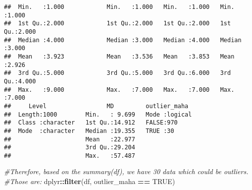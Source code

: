 \documentclass[]{article}
\newenvironment{Shaded}{\begin{snugshade}}{\end{snugshade}}
\newcommand{\KeywordTok}[1]{\textcolor[rgb]{0.13,0.29,0.53}{\textbf{#1}}}
\newcommand{\StringTok}[1]{\textcolor[rgb]{0.31,0.60,0.02}{#1}}
\newcommand{\CommentTok}[1]{\textcolor[rgb]{0.56,0.35,0.01}{\textit{#1}}}
\newcommand{\OtherTok}[1]{\textcolor[rgb]{0.56,0.35,0.01}{#1}}
\newcommand{\OperatorTok}[1]{\textcolor[rgb]{0.81,0.36,0.00}{\textbf{#1}}}
\newcommand{\NormalTok}[1]{#1}
\begin{document}
\begin{verbatim}
##  Min.   :1.000            Min.   :1.000   Min.   :1.000   Min.   :1.000  
##  1st Qu.:2.000            1st Qu.:2.000   1st Qu.:2.000   1st Qu.:2.000  
##  Median :4.000            Median :3.000   Median :4.000   Median :3.000  
##  Mean   :3.923            Mean   :3.536   Mean   :3.853   Mean   :2.926  
##  3rd Qu.:5.000            3rd Qu.:5.000   3rd Qu.:6.000   3rd Qu.:4.000  
##  Max.   :9.000            Max.   :7.000   Max.   :7.000   Max.   :7.000  
##     Level                 MD         outlier_maha   
##  Length:1000        Min.   : 9.699   Mode :logical  
##  Class :character   1st Qu.:14.912   FALSE:970      
##  Mode  :character   Median :19.355   TRUE :30       
##                     Mean   :22.977                  
##                     3rd Qu.:29.204                  
##                     Max.   :57.487
\end{verbatim}

\begin{Shaded}
\begin{Highlighting}[]
\CommentTok{#Therefore, based on the summary(df), we have 30 data which could be outliers.}
\CommentTok{#Those are:}
\NormalTok{dplyr}\OperatorTok{::}\KeywordTok{filter}\NormalTok{(df, outlier_maha }\OperatorTok{==}\StringTok{ }\OtherTok{TRUE}\NormalTok{)}
\end{Highlighting}
\end{Shaded}
\end{document}
